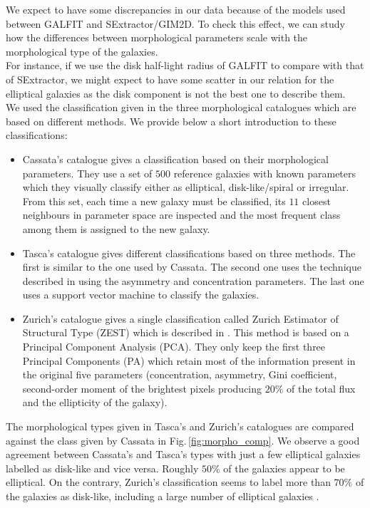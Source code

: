 We expect to have some discrepancies in our data because of the models used between GALFIT and SExtractor/GIM2D. To check this effect, we can study how the differences between morphological parameters scale with the morphological type of the galaxies. \\

For instance, if we use the disk half-light radius of GALFIT to compare with that of SExtractor, we might expect to have some scatter in our relation for the elliptical galaxies as the disk component is not the best one to describe them.\\

We used the classification given in the three morphological catalogues which are based on different methods. We provide below a short introduction to these classifications:\\

\begin{itemize}
	\item Cassata's catalogue gives a classification based on their morphological parameters. They use a set of $500$ reference galaxies with known parameters which they visually classify either as elliptical, disk-like/spiral or irregular. From this set, each time a new galaxy must be classified, its $11$ closest neighbours in parameter space are inspected and the most frequent class among them is assigned to the new galaxy.
	
	\item Tasca's catalogue gives different classifications based on three methods. The first is similar to the one used by Cassata. The second one uses the technique described in  using the asymmetry and concentration parameters. The last one uses a support vector machine to classify the galaxies.
	
	\item Zurich's catalogue gives a single classification called Zurich Estimator of Structural Type (ZEST) which is described in . This method is based on a Principal Component Analysis (PCA). They only keep the first three Principal Components (PA) which retain most of the information present in the original five parameters (concentration, asymmetry, Gini coefficient, second-order moment of the brightest pixels producing $20\%$ of the total flux and the ellipticity of the galaxy).
\end{itemize}

The morphological types given in Tasca's and Zurich's catalogues are compared against the class given by Cassata in Fig.\,\ref{fig:morpho_comp}. We observe a good agreement between Cassata's and Tasca's types with just a few elliptical galaxies labelled as disk-like and vice versa. Roughly $50\%$ of the galaxies appear to be elliptical. On the contrary, Zurich's classification seems to label more than $70\%$ of the galaxies as disk-like, including a large number of elliptical galaxies .\\

